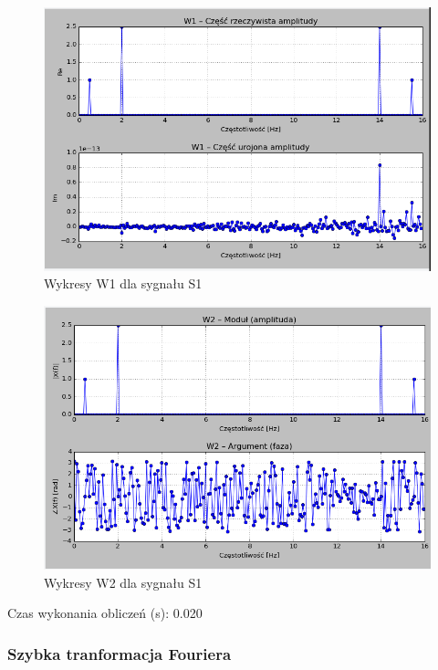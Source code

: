 \documentclass{article}
\begin{document}
{                \FloatBarrier
                \begin{figure}[h!]
                    \centering
                    \includegraphics[width=1\textwidth]{img/w1s1.png}
                    \caption{Wykresy W1 dla sygnału S1}
                \end{figure}

                \begin{figure}[h!]
                    \centering
                    \includegraphics[width=1\textwidth]{img/w2s1.png}
                    \caption{Wykresy W2 dla sygnału S1}
                \end{figure}
                \FloatBarrier

                Czas wykonania obliczeń (s): 0.020

        \subsubsection{Szybka tranformacja Fouriera}

}
\end{document}
